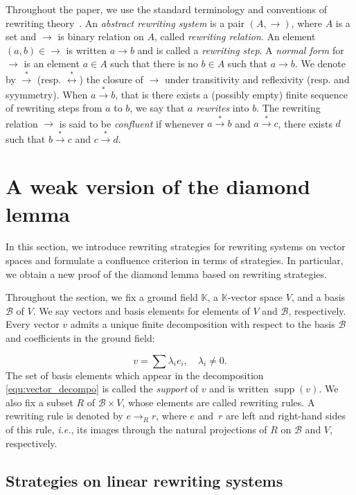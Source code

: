 \documentclass[10pt]{easychair}
\theoremstyle{definition}
\newcommand\ie{\emph{i.e.}}
\DeclareMathOperator{\supp}{supp}
\newcommand\basis{\mathscr{B}}
\newcommand\K{\mathbb{K}}
\newcommand\rewR{\to_R}
\newcommand\rewTrans{\overset{*}{\to}}
\newcommand\rewEquiv{\overset{*}{\leftrightarrow}}
\begin{document}
Throughout the paper, we use the standard terminology and conventions of
rewriting theory~\cite{MR1629216}. An {\em abstract rewriting system} is 
a pair $(A,\to)$, where $A$ is a set and $\to$ is binary relation on $A$,
called {\em rewriting relation}. An element $(a,b)\in\to$ is written
$a\to b$ and is called a {\em rewriting step}. A {\em normal form} for
$\to$ is an element $a\in A$ such that there is no $b\in A$ such that
$a\to b$. We denote by $\rewTrans$ (resp. $\rewEquiv$) the closure of
$\to$ under transitivity and reflexivity (resp. and syymmetry). When
$a\rewTrans b$, that is there exists a (possibly empty) finite sequence
of rewriting steps from $a$ to  $b$, we say that $a$ {\em rewrites} into
$b$. The rewriting relation $\to$ is said to be {\em confluent} if
whenever $a\rewTrans b$ and $a\rewTrans c$, there exists $d$ such that
$b\rewTrans c$ and $c\rewTrans d$. 


\section{A weak version of the diamond lemma}
\label{sec:a_weak_version_of_the_diamond_lemma}

In this section, we introduce rewriting strategies for rewriting systems
on vector spaces and formulate a confluence criterion in terms of
strategies. In particular, we obtain a new proof of the diamond lemma
based on rewriting strategies.
\medskip

Throughout the section, we fix a ground field $\K$, a $\K$-vector space
$V$, and a basis $\basis$ of $V$. We say vectors and basis elements for
elements of $V$ and $\basis$, respectively. Every vector $v$ admits a
unique finite decomposition with respect to the basis $\basis$ and
coefficients in the ground field:

\begin{equation}\label{equ:vector_decompo}
  v=\sum\lambda_ie_i,\quad\lambda_i\neq 0.
\end{equation}
The set of basis elements which appear in the decomposition
\eqref{equ:vector_decompo} is called the {\it support} of $v$ and is
written $\supp(v)$. We also fix a subset $R$ of $\basis\times V$, whose
elements are called rewriting rules. A rewriting rule is denoted by
$e\rewR r$, where $e$ and~$r$ are left and right-hand sides of this rule,
\ie, its images through the natural projections of $R$ on $\basis$ and
$V$, respectively.

\subsection{Strategies on linear rewriting systems}
\label{sec:strategies_on_linear_rewriting_systems}
\end{document}
